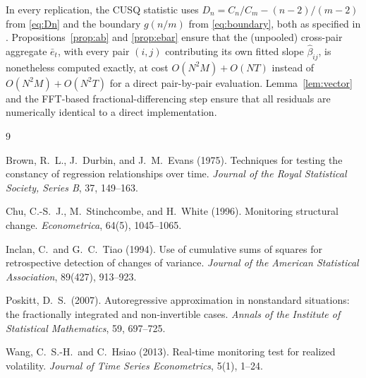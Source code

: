 \documentclass[12pt]{article}
\begin{document}
In every replication, the CUSQ statistic uses $D_n = C_n/C_m - (n-2)/(m-2)$
from \eqref{eq:Dn} and the boundary $g(n/m)$ from \eqref{eq:boundary},
both as specified in \citet{WangHsiao2013}.
Propositions~\ref{prop:ab} and \ref{prop:ebar} ensure that the (unpooled)
cross-pair aggregate $\bar e_t$, with every pair $(i,j)$ contributing its
own fitted slope $\hat\beta_{ij}$, is nonetheless computed exactly, at cost
$O(N^2M)+O(NT)$ instead of $O(N^2M)+O(N^2T)$ for a direct pair-by-pair
evaluation. Lemma~\ref{lem:vector} and the FFT-based
fractional-differencing step ensure that all residuals are numerically
identical to a direct implementation.

\begin{thebibliography}{9}

Brown, R.~L., J.~Durbin, and J.~M.~Evans (1975).
\newblock Techniques for testing the constancy of regression relationships
  over time.
\newblock \emph{Journal of the Royal Statistical Society, Series B}, 37,
  149--163.

Chu, C.-S.~J., M.~Stinchcombe, and H.~White (1996).
\newblock Monitoring structural change.
\newblock \emph{Econometrica}, 64(5), 1045--1065.

Inclan, C.\ and G.~C.~Tiao (1994).
\newblock Use of cumulative sums of squares for retrospective detection of
  changes of variance.
\newblock \emph{Journal of the American Statistical Association}, 89(427),
  913--923.

Poskitt, D.~S.\ (2007).
\newblock Autoregressive approximation in nonstandard situations: the
  fractionally integrated and non-invertible cases.
\newblock \emph{Annals of the Institute of Statistical Mathematics}, 59,
  697--725.

Wang, C.~S.-H.\ and C.~Hsiao (2013).
\newblock Real-time monitoring test for realized volatility.
\newblock \emph{Journal of Time Series Econometrics}, 5(1), 1--24.

\end{thebibliography}
\end{document}
